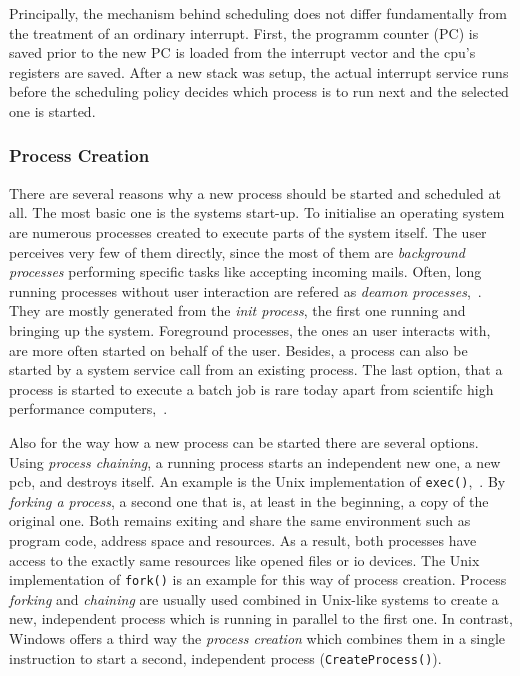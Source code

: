 Principally, the mechanism behind scheduling does not differ fundamentally from the treatment of an ordinary interrupt.
First, the programm counter (PC) is saved prior to the new PC is loaded from the interrupt vector and the \ac{cpu}'s registers are saved.
After a new stack was setup, the actual interrupt service runs before the scheduling policy decides which process is to run next and the selected one is started\cite{tanenbaum-modern-operating-systems}.

\subsubsection*{Process Creation}
There are several reasons why a new process should be started and scheduled at all.
The most basic one is the systems start-up.
To initialise an operating system are numerous processes created to execute parts of the system itself.
The user perceives very few of them directly, since the most of them are \textit{background processes} performing specific tasks like accepting incoming mails.
Often, long running processes without user interaction are refered as \textit{deamon processes}\cite{glatz2015betriebssysteme},~\cite{tanenbaum-modern-operating-systems}.
They are mostly generated from the \textit{init process}, the first one running and bringing up the system.
Foreground processes, the ones an user interacts with, are more often started on behalf of the user.
Besides, a process can also be started by a system service call from an existing process.
The last option, that a process is started to execute a batch job is rare today apart from scientifc high performance computers\cite{tanenbaum-modern-operating-systems},~\cite{glatz2015betriebssysteme}.

Also for the way how a new process can be started there are several options.
Using \textit{process chaining}, a running process starts an independent new one, a new \ac{pcb}, and destroys itself\cite{achilles2006betriebssysteme}.
An example is the Unix implementation of \texttt{exec()}\cite{glatz2015betriebssysteme},~\cite{tanenbaum-modern-operating-systems}.
By \textit{forking a process}, a second one that is, at least in the beginning, a copy of the original one.
Both remains exiting and share the same environment such as program code, address space and resources\cite{tanenbaum-modern-operating-systems}.
As a result, both processes have access to the exactly same resources like opened files or \ac{io} devices\cite{achilles2006betriebssysteme}.
The Unix implementation of \texttt{fork()} is an example for this way of process creation.
Process \textit{forking} and \textit{chaining} are usually used combined in Unix-like systems to create a new, independent process which is running in parallel to the first one\cite{tanenbaum-modern-operating-systems}.
In contrast, Windows offers a third way the \textit{process creation} which combines them in a single instruction to start a second, independent process (\texttt{CreateProcess()})\cite{glatz2015betriebssysteme}.

